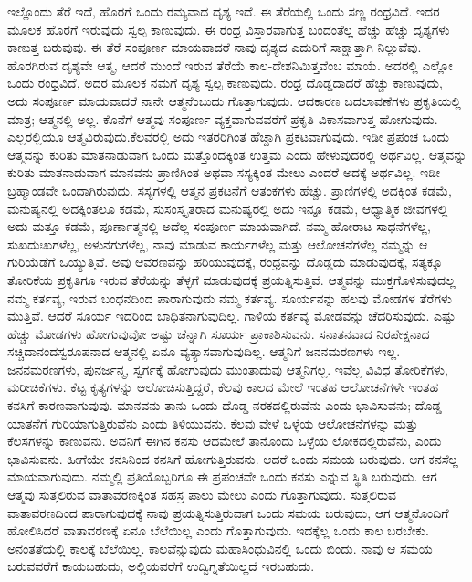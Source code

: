 ಇಲ್ಲೊಂದು ತೆರೆ ಇದೆ, ಹೊರಗೆ ಒಂದು ರಮ್ಯವಾದ ದೃಶ್ಯ ಇದೆ. ಈ ತೆರೆಯಲ್ಲಿ ಒಂದು ಸಣ್ಣ ರಂಧ್ರವಿದೆ. ಇದರ ಮೂಲಕ ಹೊರಗೆ ಇರುವುದು ಸ್ವಲ್ಪ ಕಾಣುವುದು. ಈ ರಂಧ್ರ ವಿಸ್ತಾರವಾಗುತ್ತ ಬಂದಂತೆಲ್ಲ ಹೆಚ್ಚು ಹೆಚ್ಚು ದೃಶ್ಯಗಳು ಕಾಣುತ್ತ ಬರುವುವು. ಈ ತೆರೆ ಸಂಪೂರ್ಣ ಮಾಯವಾದರೆ ನಾವು ದೃಶ್ಯದ ಎದುರಿಗೆ ಸಾಕ್ಷಾತ್ತಾಗಿ ನಿಲ್ಲುವೆವು. ಹೊರಗಿರುವ ದೃಶ್ಯವೇ ಆತ್ಮ, ಆದರೆ ಮುಂದೆ ಇರುವ ತೆರೆಯೆ ಕಾಲ-ದೇಶನಿಮಿತ್ತವೆಂಬ ಮಾಯೆ. ಅದರಲ್ಲಿ ಎಲ್ಲೋ ಒಂದು ರಂಧ್ರವಿದೆ, ಅದರ ಮೂಲಕ ನಮಗೆ ದೃಶ್ಯ ಸ್ವಲ್ಪ ಕಾಣುವುದು. ರಂಧ್ರ ದೊಡ್ಡದಾದರೆ ಹೆಚ್ಚು ಕಾಣುವುದು, ಅದು ಸಂಪೂರ್ಣ ಮಾಯವಾದರೆ ನಾನೇ ಆತ್ಮನೆಂಬುದು ಗೊತ್ತಾಗುವುದು. ಆದಕಾರಣ ಬದಲಾವಣೆಗಳು ಪ್ರಕೃತಿಯಲ್ಲಿ ಮಾತ್ರ; ಆತ್ಮನಲ್ಲಿ ಅಲ್ಲ. ಕೊನೆಗೆ ಆತ್ಮವು ಸಂಪೂರ್ಣ ವ್ಯಕ್ತವಾಗುವವರೆಗೆ ಪ್ರಕೃತಿ ವಿಕಾಸವಾಗುತ್ತ ಹೋಗುವುದು. ಎಲ್ಲರಲ್ಲಿಯೂ ಆತ್ಮವಿರುವುದು.\break ಕೆಲವರಲ್ಲಿ ಅದು ಇತರರಿಗಿಂತ ಹೆಚ್ಚಾಗಿ ಪ್ರಕಟವಾಗುವುದು. ಇಡೀ ಪ್ರಪಂಚ ಒಂದು ಆತ್ಮವನ್ನು ಕುರಿತು ಮಾತನಾಡುವಾಗ ಒಂದು ಮತ್ತೊಂದಕ್ಕಿಂತ ಉತ್ತಮ ಎಂದು ಹೇಳುವುದರಲ್ಲಿ ಅರ್ಥವಿಲ್ಲ. ಆತ್ಮವನ್ನು ಕುರಿತು ಮಾತನಾಡುವಾಗ ಮಾನವನು ಪ್ರಾಣಿಗಿಂತ ಅಥವಾ ಸಸ್ಯಕ್ಕಿಂತ ಮೇಲು ಎಂದರೆ ಅದಕ್ಕೆ ಅರ್ಥವಿಲ್ಲ. ಇಡೀ ಬ್ರಹ್ಮಾಂಡವೇ ಒಂದಾಗಿರುವುದು. ಸಸ್ಯಗಳಲ್ಲಿ ಆತ್ಮನ ಪ್ರಕಟನೆಗೆ ಆತಂಕಗಳು ಹೆಚ್ಚು. ಪ್ರಾಣಿಗಳಲ್ಲಿ ಅದಕ್ಕಿಂತ ಕಡಮೆ, ಮನುಷ್ಯನಲ್ಲಿ ಅದಕ್ಕಿಂತಲೂ ಕಡಮೆ, ಸುಸಂಸ್ಕೃತರಾದ ಮನುಷ್ಯರಲ್ಲಿ ಅದು ಇನ್ನೂ ಕಡಮೆ, ಆಧ್ಯಾತ್ಮಿಕ ಜೀವಗಳಲ್ಲಿ ಅದು ಮತ್ತೂ ಕಡಮೆ, ಪೂರ್ಣಾತ್ಮನಲ್ಲಿ ಅದೆಲ್ಲ ಸಂಪೂರ್ಣ ಮಾಯವಾಗಿದೆ. ನಮ್ಮ ಹೋರಾಟ ಸಾಧನೆಗಳೆಲ್ಲ, ಸುಖದುಃಖಗಳೆಲ್ಲ, ಅಳುನಗುಗಳೆಲ್ಲ, ನಾವು ಮಾಡುವ ಕಾರ್ಯಗಳೆಲ್ಲ ಮತ್ತು ಆಲೋಚನೆಗಳೆಲ್ಲ ನಮ್ಮನ್ನು ಆ ಗುರಿಯೆಡೆಗೆ ಒಯ್ಯುತ್ತಿವೆ. ಅವು ಆವರಣವನ್ನು ಹರಿಯುವುದಕ್ಕೆ, ರಂಧ್ರವನ್ನು ದೊಡ್ಡದು ಮಾಡುವುದಕ್ಕೆ, ಸತ್ಯಕ್ಕೂ ತೋರಿಕೆಯ ಪ್ರಕೃತಿಗೂ ಇರುವ ತೆರೆಯನ್ನು ತೆಳ್ಳಗೆ ಮಾಡುವುದಕ್ಕೆ ಪ್ರಯತ್ನಿಸುತ್ತಿವೆ. ಆತ್ಮವನ್ನು ಮುಕ್ತಗೊಳಿಸುವುದಲ್ಲ ನಮ್ಮ ಕರ್ತವ್ಯ, ಇರುವ ಬಂಧನದಿಂದ ಪಾರಾಗುವುದು ನಮ್ಮ ಕರ್ತವ್ಯ. ಸೂರ್ಯನನ್ನು ಹಲವು ಮೋಡಗಳ ತೆರೆಗಳು ಮುತ್ತಿವೆ. ಆದರೆ ಸೂರ್ಯ ಇದರಿಂದ ಬಾಧಿತನಾಗುವುದಿಲ್ಲ. ಗಾಳಿಯ ಕರ್ತವ್ಯ ಮೋಡವನ್ನು ಚೆದರಿಸುವುದು. ಎಷ್ಟು ಹೆಚ್ಚು ಮೋಡಗಳು ಹೋಗುವುವೋ ಅಷ್ಟು ಚೆನ್ನಾಗಿ ಸೂರ್ಯ ಪ್ರಾಕಾಶಿಸುವನು. ಸನಾತನವಾದ ನಿರಪೇಕ್ಷನಾದ ಸಚ್ಚಿದಾನಂದಸ್ವರೂಪನಾದ ಆತ್ಮನಲ್ಲಿ ಏನೂ ವ್ಯತ್ಯಾಸವಾಗುವುದಿಲ್ಲ. ಆತ್ಮನಿಗೆ ಜನನಮರಣಗಳು ಇಲ್ಲ. ಜನನಮರಣಗಳು, ಪುನರ್ಜನ್ಮ, ಸ್ವರ್ಗಕ್ಕೆ ಹೋಗುವುದು ಮುಂತಾದುವು ಆತ್ಮನಿಗಲ್ಲ. ಇವೆಲ್ಲ ವಿವಿಧ ತೋರಿಕೆಗಳು, ಮರೀಚಿಕೆಗಳು. ಕೆಟ್ಟ ಕೃತ್ಯಗಳನ್ನು ಆಲೋಚಿಸುತ್ತಿದ್ದರೆ, ಕೆಲವು ಕಾಲದ ಮೇಲೆ ಇಂತಹ ಆಲೋಚನೆಗಳೇ ಇಂತಹ ಕನಸಿಗೆ ಕಾರಣವಾಗುವುವು. ಮಾನವನು ತಾನು ಒಂದು ದೊಡ್ಡ ನರಕದಲ್ಲಿರುವೆನು ಎಂದು ಭಾವಿಸುವನು; ದೊಡ್ಡ ಯಾತನೆಗೆ ಗುರಿಯಾಗುತ್ತಿರುವೆನು ಎಂದು ತಿಳಿಯುವನು. ಕೆಲವು ವೇಳೆ ಒಳ್ಳೆಯ ಆಲೋಚನೆಗಳನ್ನು ಮತ್ತು ಕೆಲಸಗಳನ್ನು ಕಾಣುವನು. ಅವನಿಗೆ ಈಗಿನ ಕನಸು ಆದಮೇಲೆ ತಾನೊಂದು ಒಳ್ಳೆಯ ಲೋಕದಲ್ಲಿರುವೆನು, ಎಂದು ಭಾವಿಸುವನು. ಹೀಗೆಯೇ ಕನಸಿನಿಂದ ಕನಸಿಗೆ ಹೋಗುತ್ತಿರುವನು. ಆದರೆ ಒಂದು ಸಮಯ ಬರುವುದು. ಆಗ ಕನಸೆಲ್ಲ ಮಾಯವಾಗುವುದು. ನಮ್ಮಲ್ಲಿ ಪ್ರತಿಯೊಬ್ಬರಿಗೂ ಈ ಪ್ರಪಂಚವೇ ಒಂದು ಕನಸು ಎನ್ನುವ ಸ್ಥಿತಿ ಬರುವುದು. ಆಗ ಆತ್ಮವು ಸುತ್ತಲಿರುವ ವಾತಾವರಣಕ್ಕಿಂತ ಸಹಸ್ರ ಪಾಲು ಮೇಲು ಎಂದು ಗೊತ್ತಾಗುವುದು. ಸುತ್ತಲಿರುವ ವಾತಾವರಣದಿಂದ ಪಾರಾಗುವುದಕ್ಕೆ ನಾವು ಪ್ರಯತ್ನಿಸುತ್ತಿರುವಾಗ ಒಂದು ಸಮಯ ಬರುವುದು, ಆಗ ಆತ್ಮನೊಂದಿಗೆ ಹೋಲಿಸಿದರೆ ವಾತಾವರಣಕ್ಕೆ ಏನೂ ಬೆಲೆಯಿಲ್ಲ ಎಂದು ಗೊತ್ತಾಗುವುದು. ಇದಕ್ಕೆಲ್ಲ ಒಂದು ಕಾಲ ಬರಬೇಕು. ಅನಂತತೆಯಲ್ಲಿ ಕಾಲಕ್ಕೆ ಬೆಲೆಯಿಲ್ಲ. ಕಾಲವೆನ್ನುವುದು ಮಹಾಸಿಂಧುವಿನಲ್ಲಿ ಒಂದು ಬಿಂದು. ನಾವು ಆ ಸಮಯ ಬರುವವರೆಗೆ ಕಾಯಬಹುದು, ಅಲ್ಲಿಯವರೆಗೆ ಉದ್ವಿಗ್ನತೆಯಿಲ್ಲದೆ ಇರಬಹುದು.

